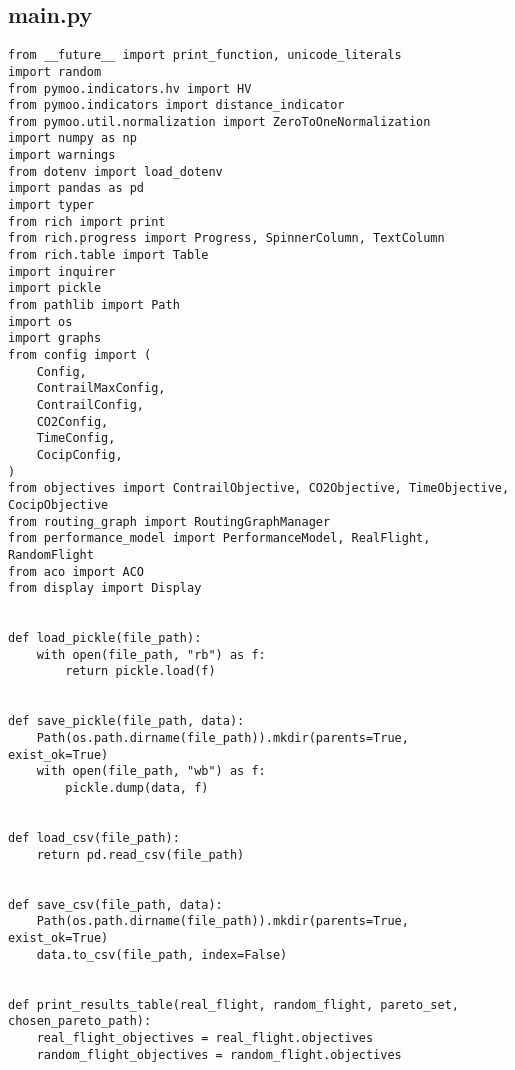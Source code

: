 \subsection{main.py}
\begin{verbatim}
from __future__ import print_function, unicode_literals
import random
from pymoo.indicators.hv import HV
from pymoo.indicators import distance_indicator
from pymoo.util.normalization import ZeroToOneNormalization
import numpy as np
import warnings
from dotenv import load_dotenv
import pandas as pd
import typer
from rich import print
from rich.progress import Progress, SpinnerColumn, TextColumn
from rich.table import Table
import inquirer
import pickle
from pathlib import Path
import os
import graphs
from config import (
    Config,
    ContrailMaxConfig,
    ContrailConfig,
    CO2Config,
    TimeConfig,
    CocipConfig,
)
from objectives import ContrailObjective, CO2Objective, TimeObjective, CocipObjective
from routing_graph import RoutingGraphManager
from performance_model import PerformanceModel, RealFlight, RandomFlight
from aco import ACO
from display import Display


def load_pickle(file_path):
    with open(file_path, "rb") as f:
        return pickle.load(f)


def save_pickle(file_path, data):
    Path(os.path.dirname(file_path)).mkdir(parents=True, exist_ok=True)
    with open(file_path, "wb") as f:
        pickle.dump(data, f)


def load_csv(file_path):
    return pd.read_csv(file_path)


def save_csv(file_path, data):
    Path(os.path.dirname(file_path)).mkdir(parents=True, exist_ok=True)
    data.to_csv(file_path, index=False)


def print_results_table(real_flight, random_flight, pareto_set, chosen_pareto_path):
    real_flight_objectives = real_flight.objectives
    random_flight_objectives = random_flight.objectives


\end{verbatim}
